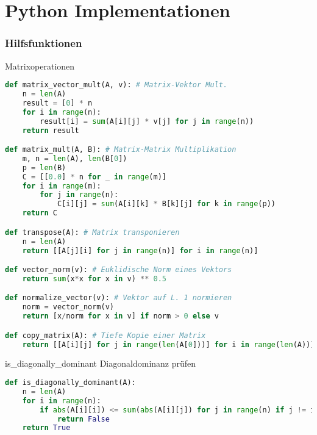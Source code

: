 \section{Python Implementationen}

\subsubsection{Hilfsfunktionen}

\begin{examplecode}{Matrixoperationen}
\begin{lstlisting}[language=Python, style=basesmol]
def matrix_vector_mult(A, v): # Matrix-Vektor Mult.
    n = len(A)
    result = [0] * n
    for i in range(n):
        result[i] = sum(A[i][j] * v[j] for j in range(n))
    return result

def matrix_mult(A, B): # Matrix-Matrix Multiplikation
    m, n = len(A), len(B[0])
    p = len(B)
    C = [[0.0] * n for _ in range(m)]
    for i in range(m):
        for j in range(n):
            C[i][j] = sum(A[i][k] * B[k][j] for k in range(p))
    return C

def transpose(A): # Matrix transponieren
    n = len(A)
    return [[A[j][i] for j in range(n)] for i in range(n)]

def vector_norm(v): # Euklidische Norm eines Vektors
    return sum(x*x for x in v) ** 0.5

def normalize_vector(v): # Vektor auf L. 1 normieren
    norm = vector_norm(v)
    return [x/norm for x in v] if norm > 0 else v

def copy_matrix(A): # Tiefe Kopie einer Matrix
    return [[A[i][j] for j in range(len(A[0]))] for i in range(len(A))]
\end{lstlisting}
\end{examplecode}

\begin{examplecode}{is\_diagonally\_dominant} Diagonaldominanz prüfen
\begin{lstlisting}[language=Python, style=basesmol]
def is_diagonally_dominant(A):
    n = len(A)
    for i in range(n):
        if abs(A[i][i]) <= sum(abs(A[i][j]) for j in range(n) if j != i):
            return False
    return True
\end{lstlisting}
\end{examplecode}

